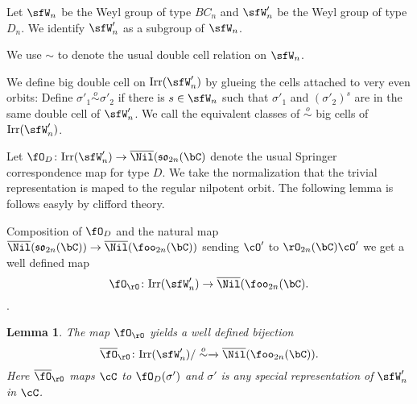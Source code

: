 \documentclass[12pt,a4paper]{amsart}
\def\fso{\mathfrak{so}}
\numberwithin{equation}{section}
\newtheorem{lem}[thm]{Lemma}
\theoremstyle{remark}
\def\tdLS{\tilde{\mathrm{d}}_{\mathrm{LS}}}
\def\tdSP{\tilde{\mathrm{d}}_{\mathrm{SP}}}
\begin{document}
\def\msim{\stackrel{m}{\sim}}
\def\osim{\stackrel{o}{\sim}}

\def\Irr{\mathrm{Irr}}
\def\bNil{\overline{\Nil}}


\def\Irrms{\Irr^{\mathrm ms}}

\def\tdLS{\tilde{\mathrm d}_{\mathrm LS}}
\def\tdSP{\tilde{\mathrm d}_{\mathrm SP}}

\def\Springer{\fO}
\def\SpringerD{\fO_D}
\def\SpringerO{\fO_{\rO}}
\def\bSpringerO{\overline{\fO}_{\rO}}
\def\RSp{\fR_C}

Let $\sfW_{n}$ be the Weyl group of type $BC_{n}$ and $\sfW'_{n}$ be the Weyl
group of type $D_{n}$. We identify $\sfW'_{n}$ as a subgroup of $\sfW_{n}$.

We use $\sim$ to denote the usual double cell relation on $\sfW_{n}$.

We define big double cell on $\Irr(\sfW'_{n})$ by glueing the cells attached to
very even orbits:
Define $\sigma'_{1}\osim \sigma'_{2}$ if there is $s\in \sfW_{n}$ such that
$\sigma'_{1}$ and $(\sigma'_{2})^{s}$ are in the same double cell of $\sfW'_{n}$.
We call the equivalent classes of $\osim$ big cells of $\Irr(\sfW'_{n})$.


Let $\SpringerD\colon \Irr(\sfW'_{n}) \rightarrow  \bNil(\fso_{2n}(\bC)$ denote
the usual Springer correspondence map for type $D$. We take the normalization
that the trivial representation is maped to the regular nilpotent orbit.
The following lemma is follows easyly by clifford theory.

Composition of $\SpringerD$ and the natural map
$\bNil(\fso_{2n}(\bC))\rightarrow \bNil(\foo_{2n}(\bC))$ sending $\cO'$ to
$\rO_{2n}(\bC)\cO'$ we get a well defined map
\[
\SpringerO\colon  \Irr(\sfW'_{n}) \rightarrow  \bNil(\foo_{2n}(\bC).
\].


\begin{lem}
 The map $\SpringerO$ yields a well defined bijection
  \[
   \bSpringerO\colon  \Irr(\sfW'_{n})/\osim \xrightarrow{ } \bNil(\foo_{2n}(\bC)).
  \]
  Here $\bSpringerO$ maps $\cC$ to $ \SpringerD(\sigma')$ and
  $\sigma'$ is any special representation of $\sfW'_{n}$ in $\cC$.
\end{lem}
\end{document}
